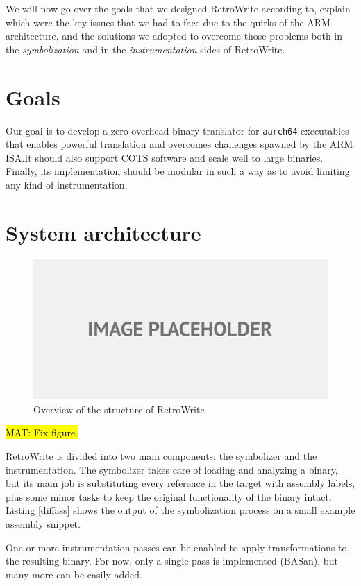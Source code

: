 \documentclass[a4paper,11pt,oneside]{report}
\newcommand{\sysname}{RetroWrite\xspace}
\DeclareRobustCommand{\mat}[1]{{\sethlcolor{red}\hl{MAT: #1}}}
\begin{document}
We will now go over the goals that we designed \sysname according to, explain
which were the key issues that we had to face due to the quirks of the ARM
architecture, and the solutions we adopted to overcome those problems both in
the \emph{symbolization} and in the \emph{instrumentation} sides of \sysname.


\section{Goals}

Our goal is to develop a zero-overhead binary translator for \texttt{aarch64} 
executables that enables powerful translation and overcomes challenges spawned 
by the ARM ISA.\@ It should also support COTS software and scale well to large 
binaries. Finally, its implementation should be modular in such a way as to 
avoid limiting any kind of instrumentation.


\section{System architecture}

\begin{figure}[h]
\includegraphics[width=15cm]{symbolizer.jpg}
\centering
\caption{Overview of the structure of \sysname}
\end{figure}
\mat{Fix figure.}

\sysname is divided into two main components: the symbolizer and the 
instrumentation.  The symbolizer takes care of loading and analyzing a binary, 
but its main job is substituting every reference in the target with assembly 
labels, plus some minor tasks to keep the original functionality of the binary 
intact. 
Listing \ref{diffass}  shows the output of the symbolization process on a
small example assembly snippet.

One or more instrumentation passes can be enabled to apply 
transformations to the resulting binary. For now, only a single pass is 
implemented (BASan), but many more can be easily added.
\end{document}

